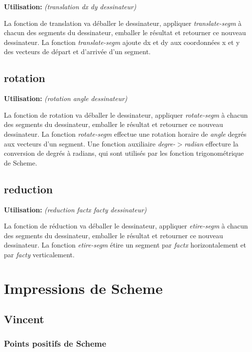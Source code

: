 \documentclass[10pt]{report}
\newcommand{\usage}[1]{\textbf{Utilisation: }\emph{#1}}
\begin{document}
\usage{(translation dx dy dessinateur)}

La fonction de translation va déballer le dessinateur, appliquer
\emph{translate-segm} à chacun des segments du dessinateur, emballer
le résultat et retourner ce nouveau dessinateur.  La fonction
\emph{translate-segm} ajoute dx et dy aux coordonnées x et y des
vecteurs de départ et d'arrivée d'un segment.


\subsection{rotation}

\usage{(rotation angle dessinateur)}

La fonction de rotation va déballer le dessinateur, appliquer
\emph{rotate-segm} à chacun des segments du dessinateur, emballer le
résultat et retourner ce nouveau dessinateur.  La fonction
\emph{rotate-segm} effectue une rotation horaire de \emph{angle}
degrés aux vecteurs d'un segment.  Une fonction auxiliaire
\emph{degre-$>$radian} effecture la conversion de degrés à radians,
qui sont utilisés par les fonction trigonométrique de Scheme.

\subsection{reduction}

\usage{(reduction factx facty dessinateur)}

La fonction de réduction va déballer le dessinateur, appliquer
\emph{etire-segm} à chacun des segments du dessinateur, emballer le
résultat et retourner ce nouveau dessinateur.  La fonction
\emph{etire-segm} étire un segment par \emph{factx} horizontalement et
par \emph{facty} verticalement.


\section{Impressions de Scheme}

\subsection{Vincent}

\subsubsection{Points positifs de Scheme}
\end{document}
